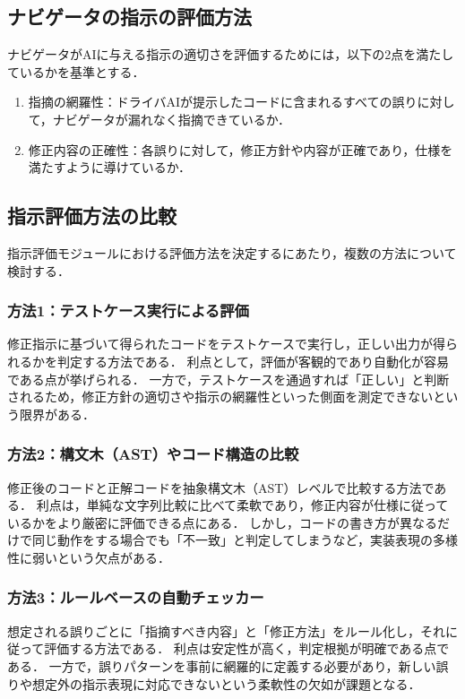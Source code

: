 \documentclass[twoside,twocolumn,10pt]{jsarticle}
\begin{document}
\subsection{ナビゲータの指示の評価方法}
ナビゲータがAIに与える指示の適切さを評価するためには，以下の2点を満たしているかを基準とする．
\begin{enumerate}
    \item 指摘の網羅性：ドライバAIが提示したコードに含まれるすべての誤りに対して，ナビゲータが漏れなく指摘できているか．
    \item 修正内容の正確性：各誤りに対して，修正方針や内容が正確であり，仕様を満たすように導けているか．
\end{enumerate}

\subsection{指示評価方法の比較}
指示評価モジュールにおける評価方法を決定するにあたり，複数の方法について検討する．

\subsubsection*{方法1：テストケース実行による評価}
修正指示に基づいて得られたコードをテストケースで実行し，正しい出力が得られるかを判定する方法である．  
利点として，評価が客観的であり自動化が容易である点が挙げられる．  
一方で，テストケースを通過すれば「正しい」と判断されるため，修正方針の適切さや指示の網羅性といった側面を測定できないという限界がある．

\subsubsection*{方法2：構文木（AST）やコード構造の比較}
修正後のコードと正解コードを抽象構文木（AST）レベルで比較する方法である．  
利点は，単純な文字列比較に比べて柔軟であり，修正内容が仕様に従っているかをより厳密に評価できる点にある．  
しかし，コードの書き方が異なるだけで同じ動作をする場合でも「不一致」と判定してしまうなど，実装表現の多様性に弱いという欠点がある．

\subsubsection*{方法3：ルールベースの自動チェッカー}
想定される誤りごとに「指摘すべき内容」と「修正方法」をルール化し，それに従って評価する方法である．  
利点は安定性が高く，判定根拠が明確である点である．  
一方で，誤りパターンを事前に網羅的に定義する必要があり，新しい誤りや想定外の指示表現に対応できないという柔軟性の欠如が課題となる．
\end{document}
